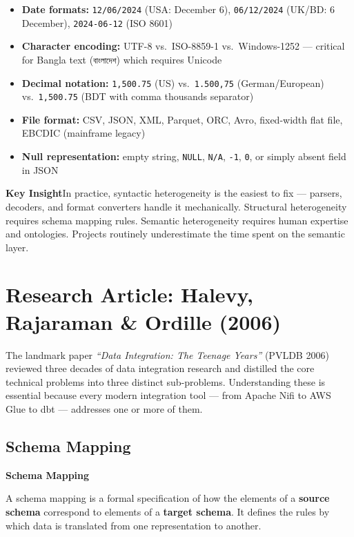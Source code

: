 \documentclass[12pt,a4paper]{article}
\newcommand{\defbox}[2]{%
  \noindent
  \colorbox{PUNavy!12}{%
    \begin{minipage}{\dimexpr\linewidth-2\fboxsep}
      \vspace{4pt}\textbf{\textcolor{PUNavy}{#1}}\par\vspace{2pt}
      #2\vspace{4pt}
    \end{minipage}%
  }\par\vspace{6pt}%
}
\newcommand{\insightbox}[1]{%
  \noindent
  \colorbox{PUGold!18}{%
    \begin{minipage}{\dimexpr\linewidth-2\fboxsep}
      \vspace{4pt}\textcolor{PUGold!70!black}{\textbf{Key Insight}}\quad #1
      \vspace{4pt}
    \end{minipage}%
  }\par\vspace{6pt}%
}
\begin{document}
\begin{itemize}[leftmargin=1.8em]
  \item \textbf{Date formats:} \texttt{12/06/2024} (USA: December 6), \texttt{06/12/2024} (UK/BD: 6 December), \texttt{2024-06-12} (ISO 8601)
  \item \textbf{Character encoding:} UTF-8 vs.\ ISO-8859-1 vs.\ Windows-1252 --- critical for Bangla text (\texttt{বাংলাদেশ}) which requires Unicode
  \item \textbf{Decimal notation:} \texttt{1,500.75} (US) vs.\ \texttt{1.500,75} (German/European) vs.\ \texttt{1{,}500.75} (BDT with comma thousands separator)
  \item \textbf{File format:} CSV, JSON, XML, Parquet, ORC, Avro, fixed-width flat file, EBCDIC (mainframe legacy)
  \item \textbf{Null representation:} empty string, \texttt{NULL}, \texttt{N/A}, \texttt{-1}, \texttt{0}, or simply absent field in JSON
\end{itemize}

\insightbox{In practice, syntactic heterogeneity is the easiest to fix — parsers, decoders, and format converters handle it mechanically.  Structural heterogeneity requires schema mapping rules.  Semantic heterogeneity requires human expertise and ontologies.  Projects routinely underestimate the time spent on the semantic layer.}

\section{Research Article: Halevy, Rajaraman \& Ordille (2006)}

The landmark paper \textit{``Data Integration: The Teenage Years''} (PVLDB 2006) reviewed three decades of data integration research and distilled the core technical problems into three distinct sub-problems.  Understanding these is essential because every modern integration tool — from Apache Nifi to AWS Glue to dbt — addresses one or more of them.

\subsection{Schema Mapping}

\defbox{Schema Mapping}{A schema mapping is a formal specification of how the elements of a \textbf{source schema} correspond to elements of a \textbf{target schema}.  It defines the rules by which data is translated from one representation to another.}
\end{document}
